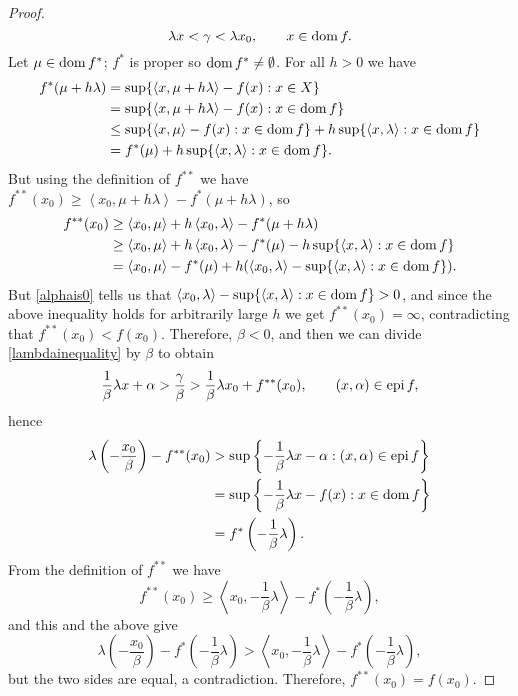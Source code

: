 \documentclass{article}
\newcommand{\inner}[2]{\left\langle #1, #2 \right\rangle}
\newcommand{\epi}{\ensuremath\mathrm{epi}\,}
\newcommand{\dom}{\ensuremath\mathrm{dom}\,}
\theoremstyle{definition}
\begin{document}
\begin{proof}
\begin{equation}
\lambda x <\gamma< \lambda x_0, \qquad x \in \dom f.
\label{alphais0}
\end{equation}
Let $\mu \in \dom f^*$; $f^*$ is proper so $\dom f^* \neq \emptyset$.
For all $h>0$ we have
\begin{align*}
f^*(\mu+h\lambda)&=\sup\{ \inner{x}{\mu+h\lambda} - f(x): x\in X\}\\
&=\sup\{ \inner{x}{\mu+h\lambda} - f(x): x\in \dom f\}\\
&\leq \sup\{ \inner{x}{\mu}-f(x): x \in \dom f\} + h \sup\{\inner{x}{\lambda}:x \in \dom f\}\\
&=f^*(\mu)+ h  \sup\{\inner{x}{\lambda}:x \in \dom f\}.
\end{align*}
But using the definition of $f^{**}$ we have
$f^{**}(x_0)\geq \inner{x_0}{\mu+h\lambda} - f^*(\mu+h\lambda)$, so
\begin{align*}
f^{**}(x_0)&\geq \inner{x_0}{\mu}+h \inner{x_0}{\lambda}- f^*(\mu+h\lambda)\\
&\geq \inner{x_0}{\mu}+h \inner{x_0}{\lambda}  -f^*(\mu)-h  \sup\{\inner{x}{\lambda}:x \in \dom f\}\\
&=\inner{x_0}{\mu} -f^*(\mu) +h( \inner{x_0}{\lambda} -  \sup\{\inner{x}{\lambda}:x \in \dom f\}).
\end{align*}
But \eqref{alphais0} tells us that $\inner{x_0}{\lambda}-\sup\{\inner{x}{\lambda}:x \in \dom f\} >0$, and since the above inequality
holds for arbitrarily large $h$ we get $f^{**}(x_0)=\infty$, contradicting that $f^{**}(x_0)<f(x_0)$. Therefore, $\beta<0$, and then
we can divide \eqref{lambdainequality} by $\beta$ to obtain
\[
\frac{1}{\beta}\lambda x  + \alpha > \frac{\gamma}{\beta} > \frac{1}{\beta} \lambda x_0 + f^{**}(x_0), \qquad (x,\alpha) \in \epi f,
\]
hence
\begin{align*}
\lambda \left( -\frac{x_0}{\beta} \right) - f^{**}(x_0)&>\sup\left\{ -\frac{1}{\beta} \lambda x  -\alpha: (x,\alpha) \in \epi f \right\}\\
&=\sup\left\{ -\frac{1}{\beta} \lambda x - f(x): x \in \dom f\right\}\\
&=f^*\left( -\frac{1}{\beta} \lambda \right).
\end{align*}
From the definition of $f^{**}$ we have
\[
f^{**}(x_0 )\geq \inner{x_0}{-\frac{1}{\beta} \lambda} - f^*\left(-\frac{1}{\beta} \lambda\right),
\]
and this and the above give
\[
\lambda \left( -\frac{x_0}{\beta} \right) - f^*\left( -\frac{1}{\beta} \lambda \right)
>\inner{x_0}{-\frac{1}{\beta} \lambda} - f^*\left(-\frac{1}{\beta} \lambda\right),
\]
but the two sides are equal, a contradiction. Therefore, $f^{**}(x_0) = f(x_0)$. 


\end{proof}
\end{document}

